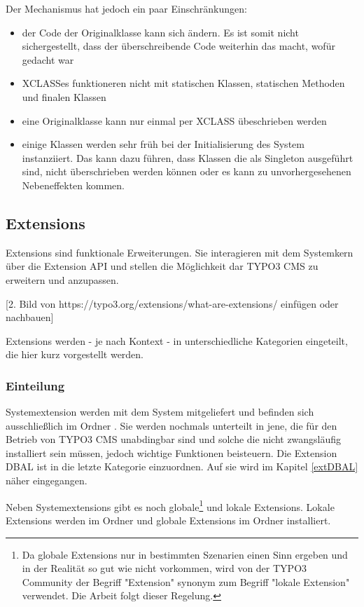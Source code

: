 Der Mechanismus hat jedoch ein paar Einschränkungen:

\begin{itemize}
	\itemsep1pt\parskip0pt
	\item
		der Code der Originalklasse kann sich ändern. Es ist somit nicht sichergestellt, dass der überschreibende Code weiterhin das macht, wofür gedacht war
	\item
		XCLASSes funktioneren nicht mit statischen Klassen, statischen Methoden und finalen Klassen
	\item
		eine Originalklasse kann nur einmal per XCLASS übeschrieben werden
	\item
		einige Klassen werden sehr früh bei der Initialisierung des System instanziiert. Das kann dazu führen, dass Klassen die als Singleton ausgeführt sind, nicht überschrieben werden können oder es kann zu unvorhergesehenen Nebeneffekten kommen.
\end{itemize}

\subsection{Extensions}
Extensions sind funktionale Erweiterungen. Sie interagieren mit dem Systemkern über die Extension API und stellen die Möglichkeit dar TYPO3 CMS zu erweitern und anzupassen.

[2. Bild von https://typo3.org/extensions/what-are-extensions/ einfügen oder nachbauen]

Extensions werden - je nach Kontext - in unterschiedliche Kategorien eingeteilt, die hier kurz vorgestellt werden.

\subsubsection{Einteilung}
\label{subsubsec:sysext}
Systemextension werden mit dem System mitgeliefert und befinden sich ausschließlich im Ordner . Sie werden nochmals unterteilt in jene, die für den Betrieb von TYPO3 CMS unabdingbar sind und solche die nicht zwangsläufig installiert sein müssen, jedoch wichtige Funktionen beisteuern. Die Extension DBAL ist in die letzte Kategorie einzuordnen. Auf sie wird im Kapitel \ref{extDBAL} näher eingegangen.

Neben Systemextensions gibt es noch globale\footnote{Da globale Extensions nur in bestimmten Szenarien einen Sinn ergeben und in der Realität so gut wie nicht vorkommen, wird von der TYPO3 Community der Begriff "Extension" synonym zum Begriff "lokale Extension" verwendet. Die Arbeit folgt dieser Regelung.} und lokale Extensions. Lokale Extensions werden im Ordner  und globale Extensions im Ordner  installiert.

